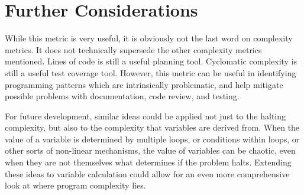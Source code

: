 \section{Further Considerations}

While this metric is very useful, it is obviously not the last word on complexity metrics.  It does not technically supersede the other complexity metrics mentioned.  Lines of code is still a useful planning tool.  Cyclomatic complexity is still a useful test coverage tool.  However, this metric can be useful in identifying programming patterns which are intrinsically problematic, and help mitigate possible problems with documentation, code review, and testing.  

For future development, similar ideas could be applied not just to the halting complexity, but also to the complexity that variables are derived from.  When the value of a variable is determined by multiple loops, or conditions within loops, or other sorts of non-linear mechanisms, the value of variables can be chaotic, even when they are not themselves what determines if the problem halts.  Extending these ideas to variable calculation could allow for an even more comprehensive look at where program complexity lies.

